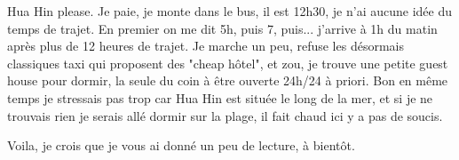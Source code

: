 \begin{multicols}{2}
Hua Hin please. Je paie, je monte dans le bus, il est 12h30, je n'ai aucune idée du temps de trajet. En premier on me dit 5h, puis 7, puis... j'arrive à 1h du matin après plus de 12 heures de trajet. Je marche un peu, refuse les désormais classiques taxi qui proposent des "cheap hôtel", et zou, je trouve une petite guest house pour dormir, la seule du coin à être ouverte 24h/24 à priori. Bon en même temps je stressais pas trop car Hua Hin est située le long de la mer, et si je ne trouvais rien je serais allé dormir sur la plage, il fait chaud ici y a pas de soucis.

Voila, je crois que je vous ai donné un peu de lecture, à bientôt.

\end{multicols}



